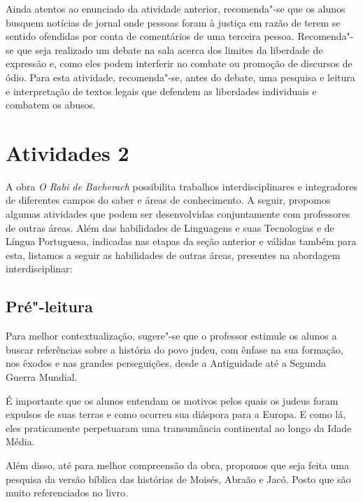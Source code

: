 \documentclass[12pt]{extarticle}
\begin{document}

Ainda atentos ao enunciado da atividade anterior,
recomenda"-se que os alunos busquem notícias de jornal onde pessoas foram
à justiça em razão de terem se sentido ofendidas por conta de
comentários de uma terceira pessoa. Recomenda"-se que seja realizado um
debate na sala acerca dos limites da liberdade de expressão e, como eles
podem interferir no combate ou promoção de discursos de ódio. Para esta
atividade, recomenda"-se, antes do debate, uma pesquisa e leitura e
interpretação de textos legais que defendem as liberdades individuais e
combatem os abusos.

\section{Atividades 2}

A obra \emph{O Rabi de Bacherach} possibilita trabalhos
interdisciplinares e integradores de diferentes campos do saber e áreas
de conhecimento. A seguir, propomos algumas atividades que podem ser
desenvolvidas conjuntamente com professores de outras áreas. Além das
habilidades de Linguagens e suas Tecnologias e de Língua Portuguesa,
indicadas nas etapas da seção anterior e válidas também para esta,
listamos a seguir as habilidades de outras áreas, presentes na abordagem
interdisciplinar:


\subsection{Pré"-leitura}
Para melhor contextualização, sugere"-se que o professor
estimule os alunos a buscar referências sobre a história do povo judeu,
com ênfase na sua formação, nos êxodos e nas grandes perseguições, desde
a Antiguidade até a Segunda Guerra Mundial.

É importante que os alunos entendam os motivos pelos quais os judeus
foram expulsos de suas terras e como ocorreu sua diáspora para a Europa.
E como lá, eles praticamente perpetuaram uma transumância continental ao
longo da Idade Média.

Além disso, até para melhor compreensão da obra, propomos que seja feita
uma pesquisa da versão bíblica das histórias de Moisés, Abraão e Jacó.
Posto que são muito referenciados no livro.
\end{document}
